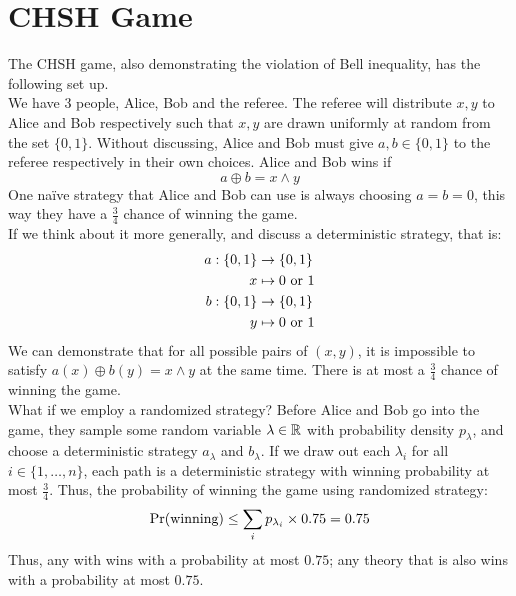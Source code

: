 \section{CHSH Game}
The CHSH game, also demonstrating the violation of Bell inequality, has the following set up. \\
We have $3$ people, Alice, Bob and the referee. The referee will distribute $x, y$ to Alice and Bob respectively such that $x, y$ are drawn uniformly at random from the set $\{0, 1\}$. Without discussing, Alice and Bob must give $a, b \in \{0, 1\}$ to the referee respectively in their own choices. Alice and Bob wins if
$$a \oplus b = x \land y$$
One na\"ive strategy that Alice and Bob can use is always choosing $a = b = 0$, this way they have a $\frac{3}{4}$ chance of winning the game. \\
If we think about it more generally, and discuss a deterministic strategy, that is:
\begin{align*}
    a: \{0, 1\} &\to \{0, 1\} \\
    x &\mapsto 0 \text{ or } 1 \\
    b: \{0, 1\} &\to \{0, 1\} \\
    y &\mapsto 0 \text{ or } 1
\end{align*}
We can demonstrate that for all possible pairs of $(x, y)$, it is impossible to satisfy $a(x) \oplus b(y) = x \land y$ at the same time. There is at most a $\frac{3}{4}$ chance of winning the game. \\
What if we employ a randomized strategy? Before Alice and Bob go into the game, they sample some random variable $\lambda \in \mathbb{R}$ with probability density $p_\lambda$, and choose a deterministic strategy $a_\lambda$ and $b_\lambda$. If we draw out each $\lambda_i$ for all $i \in \{1, \dots, n\}$, each path is a deterministic strategy with winning probability at most $\frac{3}{4}$. Thus, the probability of winning the game using randomized strategy:
$$\text{Pr}(\text{winning}) \le \sum_{i} p_{\lambda_i} \times 0.75 = 0.75$$
Thus, any  with  wins with a probability at most $0.75$; any  theory that is also  wins with a probability at most $0.75$.

